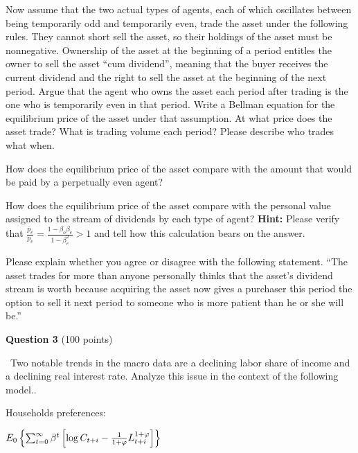 \documentclass[11pt]{article}
\begin{document}
\medskip
{}  Now assume that the  two actual types of agents, each of which oscillates between being temporarily odd and temporarily even,  trade the asset
under the following rules. They cannot short sell the asset, so their holdings of the asset must be nonnegative.  Ownership of the asset at the beginning of a period entitles the owner to sell the asset ``cum dividend'', meaning that the buyer
receives the current dividend and the right to sell the asset at the beginning of the next period.
Argue  that the agent who owns  the asset each period after trading  is the one who is temporarily even in that period.  Write a Bellman equation for the equilibrium price
of the asset under that assumption.
At what price does the asset trade? What is trading volume each period?  Please describe who trades what when.

\medskip
{}  How does the equilibrium price of the asset compare with the amount that would be paid by a perpetually even agent?

\medskip
{} How does the equilibrium price of the asset compare with the personal value  assigned  to the stream of dividends  by each type of agent?
{\bf Hint:} Please verify  that ${\frac{\bar p_e}{p_e}} = {\frac{ 1- \beta_o \beta_e}{1 - \beta_e^2}} >1$ and tell how this calculation bears on the answer.

\medskip
{}  Please explain whether you agree or disagree with the following statement.  ``The asset trades for more than anyone personally thinks that the asset's dividend stream is worth because
acquiring the asset now gives a purchaser this period  the option to sell it next period to someone who is more patient than  he or she will be.''





\newpage


\noindent \textbf{Question 3} (100 points)\medskip

\noindent\ Two notable trends in the macro data are a declining labor share
of income and a declining real interest rate. Analyze this issue in the
context of the following model..

\qquad Households preferences:

\begin{center}
$E_{0}\left\{ \sum_{t=0}^{\infty }\beta ^{t}\left[ \log C_{t+i}-\frac{1}{%
1+\varphi }L_{t+i}^{1+\varphi }\right] \right\} $
\end{center}
\end{document}
